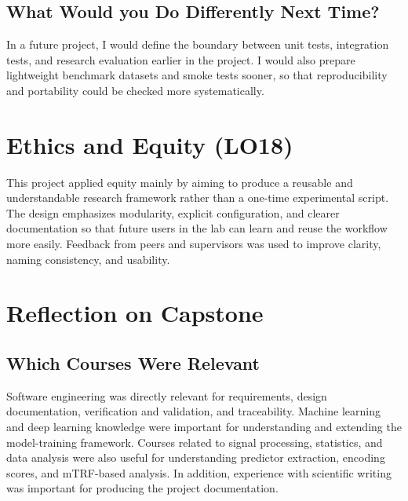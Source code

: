 \documentclass{article}
\begin{document}
\subsection{What Would you Do Differently Next Time?}


In a future project, I would define the boundary between unit tests, integration tests, and research evaluation earlier in the project.
I would also prepare lightweight benchmark datasets and smoke tests sooner, so that reproducibility and portability could be checked more systematically.





\section{Ethics and Equity (LO18)}

This project applied equity mainly by aiming to produce a reusable and understandable research framework rather than a one-time experimental script.
The design emphasizes modularity, explicit configuration, and clearer documentation so that future users in the lab can learn and reuse the workflow more easily.
Feedback from peers and supervisors was used to improve clarity, naming consistency, and usability.








\section{Reflection on Capstone}


\subsection{Which Courses Were Relevant}


Software engineering was directly relevant for requirements, design documentation, verification and validation, and traceability.
Machine learning and deep learning knowledge were important for understanding and extending the model-training framework.
Courses related to signal processing, statistics, and data analysis were also useful for understanding predictor extraction, encoding scores, and mTRF-based analysis.
In addition, experience with scientific writing was important for producing the project documentation.
\end{document}
